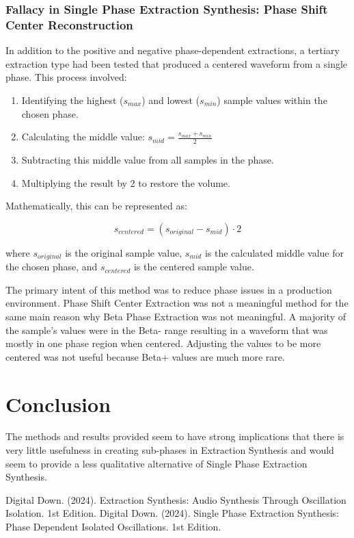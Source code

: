 \documentclass[12pt,a4paper]{article}
\begin{document}
\subsubsection{Fallacy in Single Phase Extraction Synthesis: Phase Shift Center Reconstruction}
In addition to the positive and negative phase-dependent extractions, a tertiary extraction type had been tested that produced a centered waveform from a single phase. This process involved:

\begin{enumerate}
    \item Identifying the highest ($s_{max}$) and lowest ($s_{min}$) sample values within the chosen phase.
    \item Calculating the middle value: $s_{mid} = \frac{s_{max} + s_{min}}{2}$
    \item Subtracting this middle value from all samples in the phase.
    \item Multiplying the result by 2 to restore the volume.
\end{enumerate}

Mathematically, this can be represented as:

\begin{equation*}
s_{centered} = (s_{original} - s_{mid}) \cdot 2
\end{equation*}

where $s_{original}$ is the original sample value, $s_{mid}$ is the calculated middle value for the chosen phase, and $s_{centered}$ is the centered sample value.

 The primary intent of this method was to reduce phase issues in a production environment. Phase Shift Center Extraction was not a meaningful method for the same main reason why Beta Phase Extraction was not meaningful. A majority of the sample's values were in the Beta- range resulting in a waveform that was mostly in one phase region when centered. Adjusting the values to be more centered was not useful because Beta+ values are much more rare.

\section{Conclusion}
The methods and results provided seem to have strong implications that there is very little usefulness in creating sub-phases in Extraction Synthesis and would seem to provide a less qualitative alternative of Single Phase Extraction Synthesis.

\begin{thebibliography}{9}
 Digital Down. (2024). Extraction Synthesis: Audio Synthesis Through Oscillation Isolation. 1st Edition.
 Digital Down. (2024). Single Phase Extraction Synthesis: Phase Dependent Isolated Oscillations. 1st Edition.
\end{thebibliography}
\end{document}
